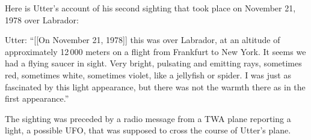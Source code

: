 %
%
%


Here is Utter's account of his second sighting that took place on November 21, 1978 over Labrador:
\begin{svgraybox}
Utter: ``[[On November 21, 1978]] this was over Labrador, at an altitude of approximately 12\,000 meters on a flight from Frankfurt to New York.
It seems we had a flying saucer in sight. Very bright, pulsating and emitting rays, sometimes red, sometimes white, sometimes violet, like a jellyfish or spider.
I was just as fascinated by this light appearance, but there was not the warmth there as in the first appearance.''
\end{svgraybox}
The sighting was preceded by a radio message from a TWA plane reporting a light, a possible UFO,
that was supposed to cross the course of Utter's plane.

